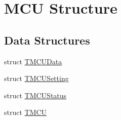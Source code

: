 \hypertarget{group___mcu_strc}{\section{M\-C\-U Structure}
\label{group___mcu_strc}
}
\subsection*{Data Structures}
\begin{DoxyCompactItemize}
\item 
struct \hyperlink{struct_t_m_c_u_data}{T\-M\-C\-U\-Data}
\item 
struct \hyperlink{struct_t_m_c_u_setting}{T\-M\-C\-U\-Setting}
\item 
struct \hyperlink{struct_t_m_c_u_status}{T\-M\-C\-U\-Status}
\item 
struct \hyperlink{struct_t_m_c_u}{T\-M\-C\-U}
\end{DoxyCompactItemize}
